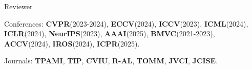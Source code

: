 


\begin{cventries}
\cvpub
{Reviewer} %
{ %
\begin{cvitems}
    \item {Conferences: \textbf{CVPR}(2023-2024), \textbf{ECCV}(2024), \textbf{ICCV}(2023), \textbf{ICML}(2024), 
        \textbf{ICLR}(2024), \textbf{NeurIPS}(2023), \textbf{AAAI}(2025),
    \textbf{BMVC}(2021-2023), \textbf{ACCV}(2024), \textbf{IROS}(2024), \textbf{ICPR}(2025). }
    \item {Journals: \textbf{TPAMI}, \textbf{TIP}, \textbf{CVIU}, \textbf{R-AL}, \textbf{TOMM}, \textbf{JVCI}, \textbf{JCISE}.}
\end{cvitems}
}
\end{cventries}

